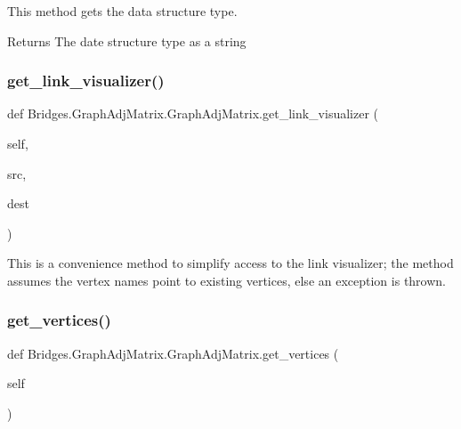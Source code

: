 This method gets the data structure type. 

\begin{DoxyReturn}{Returns}
The date structure type as a string 
\end{DoxyReturn}
\mbox{\label{class_bridges_1_1_graph_adj_matrix_1_1_graph_adj_matrix_acb341596f544ead8a39d00ec778b4a1b}} 
\subsubsection{\texorpdfstring{get\+\_\+link\+\_\+visualizer()}{get\_link\_visualizer()}}
{\footnotesize\ttfamily def Bridges.\+Graph\+Adj\+Matrix.\+Graph\+Adj\+Matrix.\+get\+\_\+link\+\_\+visualizer (\begin{DoxyParamCaption}\item[{}]{self,  }\item[{}]{src,  }\item[{}]{dest }\end{DoxyParamCaption})}



This is a convenience method to simplify access to the link visualizer; the method assumes the vertex names point to existing vertices, else an exception is thrown. 

\mbox{\label{class_bridges_1_1_graph_adj_matrix_1_1_graph_adj_matrix_a0bebc872619b97d2d1a1083511bfd62b}} 
\subsubsection{\texorpdfstring{get\+\_\+vertices()}{get\_vertices()}}
{\footnotesize\ttfamily def Bridges.\+Graph\+Adj\+Matrix.\+Graph\+Adj\+Matrix.\+get\+\_\+vertices (\begin{DoxyParamCaption}\item[{}]{self }\end{DoxyParamCaption})}



